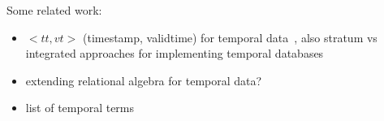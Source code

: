 %
Some related work:
\begin{itemize}
\item $<tt, vt>$ (timestamp, validtime) for temporal data~\cite{jensen1999temporal},
also stratum vs integrated approaches for implementing temporal databases
\item extending relational algebra for temporal data?~\cite{lorentzos1988extending}
\item list of temporal terms~\cite{dyreson1994consensus}
\end{itemize}

